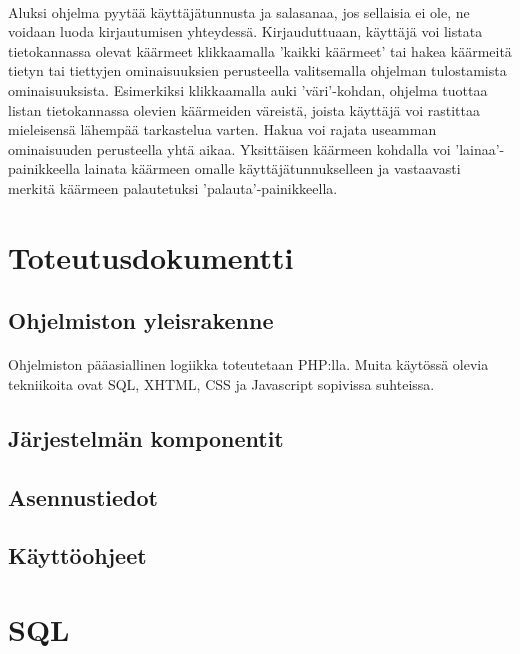 \documentclass[11pt]{article}
\begin{document}
\paragraph{} Aluksi ohjelma pyytää käyttäjätunnusta ja salasanaa, jos sellaisia ei ole, ne voidaan luoda kirjautumisen yhteydessä. Kirjauduttuaan, käyttäjä voi listata tietokannassa olevat käärmeet klikkaamalla 'kaikki käärmeet' tai hakea käärmeitä tietyn tai tiettyjen ominaisuuksien perusteella valitsemalla ohjelman tulostamista ominaisuuksista. Esimerkiksi klikkaamalla auki 'väri'-kohdan, ohjelma tuottaa listan tietokannassa olevien käärmeiden väreistä, joista käyttäjä voi rastittaa mieleisensä lähempää tarkastelua varten. Hakua voi rajata useamman ominaisuuden perusteella yhtä aikaa. Yksittäisen käärmeen kohdalla voi 'lainaa'-painikkeella lainata käärmeen omalle käyttäjä\-tunnuk\-selleen ja vastaavasti merkitä käärmeen palautetuksi 'palauta'-painikkeella.

\section{Toteutusdokumentti} %

\subsection{Ohjelmiston yleisrakenne} %

\paragraph{} Ohjelmiston pääasiallinen logiikka toteutetaan PHP:lla. Muita käytössä olevia tekniikoita ovat SQL, XHTML, CSS ja Javascript sopivissa suhteissa.

\subsection{Järjestelmän komponentit} %

\subsection{Asennustiedot} %

\subsection{Käyttöohjeet} %

\section{SQL} %
\end{document}
